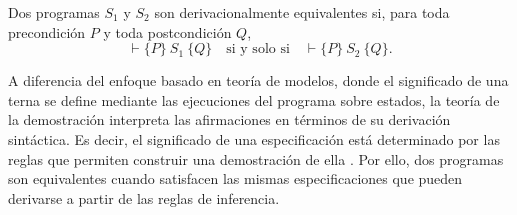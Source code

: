 \begin{definition}
Dos programas $S_1$ y $S_2$ son derivacionalmente equivalentes si, para toda precondición $P$ y toda postcondición $Q$,
\[
\vdash \{P\}\ S_1\ \{Q\}
\quad \text{si y solo si} \quad
\vdash \{P\}\ S_2\ \{Q\}.
\]
\end{definition}

A diferencia del enfoque basado en teoría de modelos, donde el significado de una terna se define mediante las ejecuciones del programa sobre estados, la teoría de la demostración interpreta las afirmaciones en términos de su derivación sintáctica. Es decir, el significado de una especificación está determinado por las reglas que permiten construir una demostración de ella \cite{Pierce:SF2}. Por ello, dos programas son equivalentes cuando satisfacen las mismas especificaciones que pueden derivarse a partir de las reglas de inferencia. 